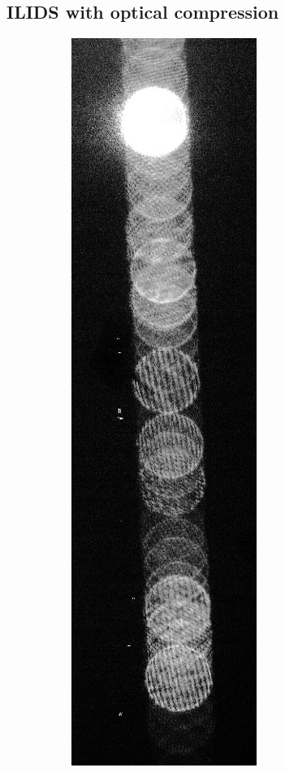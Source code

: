 \documentclass[11.5pt,oneside]{book}
\begin{document}
\subsection{ILIDS with optical compression \label{sec:ilids-compressed}}
\begin{figure}[h!]
    \centering
    \begin{subfigure}[b]{0.4\textwidth}
        \centering
        \includegraphics[height=0.6\textheight]{img/dots_cropped.jpg}
        \caption{}
    \end{subfigure}

\end{figure}
\end{document}
